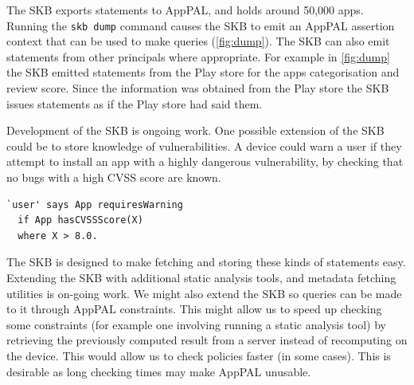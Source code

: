 \documentclass[a4paper]{scrartcl}
\begin{document}
The \ac{SKB} exports statements to AppPAL, and holds around 50,000 apps.
Running the \texttt{skb dump} command causes the SKB to emit an AppPAL assertion context that can be used to make queries (\autoref{fig:dump}).
The \ac{SKB} can also emit statements from other principals where appropriate.
For example in \autoref{fig:dump} the \ac{SKB} emitted  statements from the Play store for the apps categorisation and review score.
Since the information was obtained from the Play store the \ac{SKB} issues statements as if the Play store had said them.

Development of the \ac{SKB} is ongoing work.
One possible extension of the \ac{SKB} could be to store knowledge of vulnerabilities.
A device could warn a user if they attempt to install an app with a highly dangerous vulnerability, by checking that no bugs with a high CVSS score are known.
\begin{lstlisting}
`user' says App requiresWarning
  if App hasCVSSScore(X)
  where X > 8.0.
\end{lstlisting}
The \ac{SKB} is designed to make fetching and storing these kinds of statements easy.
Extending the \ac{SKB} with additional static analysis tools, and metadata fetching utilities is on-going work.
We might also extend the \ac{SKB} so queries can be made to it through AppPAL constraints.
This might allow us to speed up checking some constraints (for example one involving running a static analysis tool) by retrieving the previously computed result from a server instead of recomputing on the device.
This would allow us to check policies faster (in some cases).
This is desirable as long checking times may make AppPAL unusable.
\end{document}
